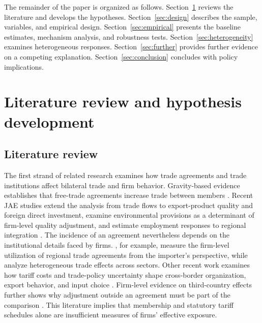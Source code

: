 \documentclass[preprint,12pt,authoryear]{elsarticle}
\begin{document}
The remainder of the paper is organized as follows. Section~\ref{sec:theory} reviews the literature and develops the hypotheses. Section~\ref{sec:design} describes the sample, variables, and empirical design. Section~\ref{sec:empirical} presents the baseline estimates, mechanism analysis, and robustness tests. Section~\ref{sec:heterogeneity} examines heterogeneous responses. Section~\ref{sec:further} provides further evidence on a competing explanation. Section~\ref{sec:conclusion} concludes with policy implications.

\section{Literature review and hypothesis development}
\label{sec:theory}

\subsection{Literature review}

The first strand of related research examines how trade agreements and trade institutions affect bilateral trade and firm behavior. Gravity-based evidence establishes that free-trade agreements increase trade between members \citep{baier2007free}. Recent JAE studies extend the analysis from trade flows to export-product quality and foreign direct investment, examine environmental provisions as a determinant of firm-level quality adjustment, and estimate employment responses to regional integration \citep{sun2022rtaquality,narayan2022agreements,zhu2025environmental,li2025integration}. The incidence of an agreement nevertheless depends on the institutional details faced by firms. \citet{hayakawa2023firm}, for example, measure the firm-level utilization of regional trade agreements from the importer's perspective, while \citet{ni2022standards} analyze heterogeneous trade effects across sectors. Other recent work examines how tariff costs and trade-policy uncertainty shape cross-border organization, export behavior, and input choice \citep{xie2023tariff,zhou2022trade,handley2024input,poilly2025regional}. Firm-level evidence on third-country effects further shows why adjustment outside an agreement must be part of the comparison \citep{lee2023thirdcountry}. This literature implies that membership and statutory tariff schedules alone are insufficient measures of firms' effective exposure.
\end{document}
